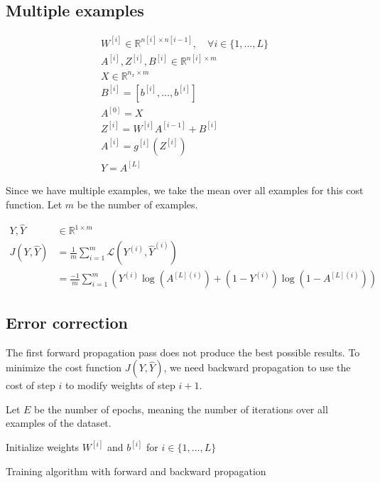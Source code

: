 \subsection{Multiple examples}
	\begin{align}
		W^{[i]}\in\mathbb{R}^{n[i]\times n[i-1]}, \quad \forall i\in\{1,\dots,L\} \\
		A^{[i]}, Z^{[i]}, B^{[i]} \in \mathbb{R}^{n[i]\times m} \\
		X \in \mathbb{R}^{n_x \times m} \\
		B^{[i]} = [b^{[i]}, \dots, b^{[i]}]\\
		A^{[0]} = X \\
		Z^{[i]} = W^{[i]} A^{[i-1]} + B^{[i]} \\
		A^{[i]} = g^{[i]}(Z^{[i]}) \\ 
		\hat{Y} = A^{[L]} 
	\end{align}
	
	Since we have multiple examples, we take the mean over all examples for this cost function.
	Let $m$ be the number of examples.
	
	\begin{align}
		Y,\hat{Y}&\in\mathbb{R}^{1\times m} \\
		J(Y, \hat{Y})  &= \frac{1}{m} \sum_{i=1}^{m} \mathcal{L}(Y^{(i)},\hat{Y}^{(i)}) \\
		&= \frac{-1}{m} \sum_{i=1}^{m} \left(
			Y^{(i)} \log(A^{[L](i)}) + (1-Y^{(i)}) \log(1 - A^{[L](i)})
		\right)
	\end{align}

\subsection{Error correction}
	The first forward propagation pass does not produce the best possible results.
	To minimize the cost function $J(Y, \hat{Y})$, we need backward propagation to use the cost of step $i$
	to modify weights of step $i+1$.
	
	Let $E$ be the number of epochs, meaning the number of iterations over all examples of the dataset.
	
	\begin{algorithm}[h]
		Initialize weights $W^{[i]}$ and $b^{[i]}$ for $i\in\{1,\dots,L\}$ \;
		\caption{Training algorithm with forward and backward propagation}
	\end{algorithm}

